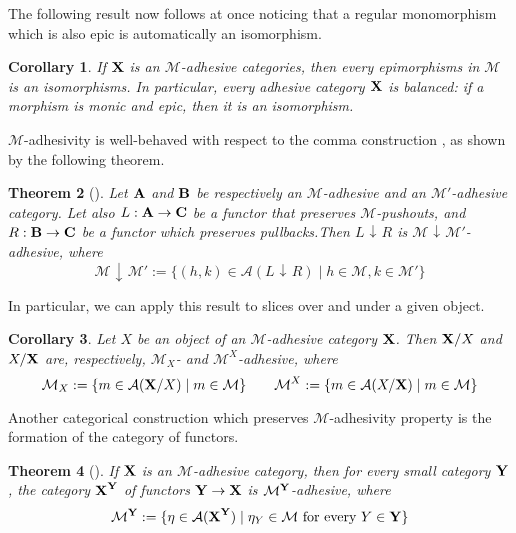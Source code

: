 \documentclass[a4paper]{article}
\def\A{\textbf {\textup{A}}}
\def\B{\textbf {\textup{B}}}
\def\C{\textbf {\textup{C}}}
\def\X{\textbf {\textup{X}}}
\def\Y{\textbf {\textup{Y}}}
\newcommand{\comma}[2]{#1\hspace{1pt} {\downarrow}\hspace{1pt} #2}
\newcommand{\cma}[2]{\mathcal{#1}\hspace{1pt} {\downarrow}\hspace{1pt} \mathcal{#2}}
\newtheorem{theorem}{Theorem}[section]
\newtheorem{corollary}[theorem]{Corollary}
\theoremstyle{definition}
\begin{document}
The following result now follows at once noticing that a regular monomorphism which is also epic is automatically an isomorphism.

\begin{corollary}\label{prop:bal}
If $\X$ is an $\mathcal{M}$-adhesive categories, then every epimorphisms in $\mathcal{M}$ is an isomorphisms. In particular, every adhesive category $\X$ is \emph{balanced}: if a morphism is monic and epic, then it is an isomorphism.
\end{corollary}


$\mathcal{M}$-adhesivity is well-behaved with respect to  the comma construction \cite{mac2013categories}, as shown by the following theorem.
\begin{theorem}[\cite{ehrig2006fundamentals,lack2005adhesive}]\label{lem:comma}
	Let $\A$ and $\B$ be respectively an $\mathcal{M}$-adhesive and an $\mathcal{M}'$-adhesive category. Let also $L:\A\rightarrow \C$ be a functor that preserves $\mathcal{M}$-pushouts, and  $R:\B\rightarrow \C$ be a functor which preserves pullbacks.Then $\comma{L}{R}$ is $\cma{M}{M'}$-adhesive, where 
	\[
	\cma{M}{M}':=\{(h,k)\in \mathcal{A}(\comma{L}{R}) \mid h\in \mathcal{M}, k\in \mathcal{M}'\}\]
\end{theorem}

In particular, we can apply this result to slices over and under a given object.

\begin{corollary}\label{cor:slice}
	Let  $X$ be an object of an $\mathcal{M}$-adhesive category $\X$. Then  $\X/X$ and $X/\X$ are, respectively, $\mathcal{M}_X$- and $\mathcal{M}^X$-adhesive, where
	\[\mathcal{M}_X:=\{m\in  \mathcal{A}(\X/X) \mid m\in \mathcal{M} \} \qquad \mathcal{M}^X:=\{m\in  \mathcal{A}(X/\X) \mid m\in \mathcal{M} \}\]
\end{corollary}


Another categorical construction which preserves $\mathcal{M}$-adhesivity property is the formation of the category of functors.

\begin{theorem}[\cite{ehrig2006fundamentals,lack2005adhesive}]\label{thm:functors}
If $\X$ is an $\mathcal{M}$-adhesive category, then for every small category $\Y$, the category $\X^\Y$  of functors $\Y\to \X$ is $\mathcal{M}^{\Y}$-adhesive, where
\[\mathcal{M}^{\Y}:=\{\eta \in \mathcal{A}(\X^\Y) \mid \eta_Y \in \mathcal{M} \text{ for every } Y\in \Y\}\]
\end{theorem}
\end{document}
